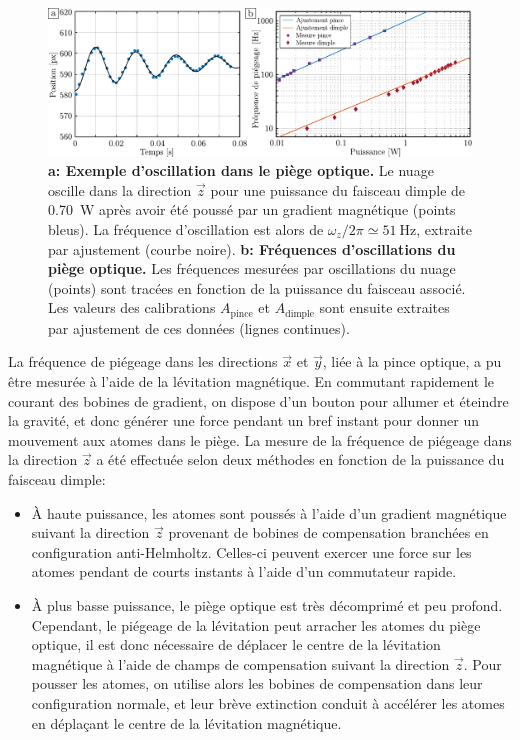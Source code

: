\begin{figure}
\centering
\includegraphics[width=\textwidth]{Fig/Modif_exp/frequences_piege_optique.pdf}
\caption{\textbf{a: Exemple d'oscillation dans le piège optique.} Le nuage oscille dans la direction $\vec{z}$ pour une puissance du faisceau dimple de \SI{0.70}{\watt} après avoir été poussé par un gradient magnétique (points bleus). La fréquence d'oscillation est alors de $\omega_z /2\pi \simeq \SI{51}{\hertz}$, extraite par ajustement (courbe noire). \textbf{b: Fréquences d'oscillations du piège optique.} Les fréquences mesurées par oscillations du nuage (points) sont tracées en fonction de la puissance du faisceau associé. Les valeurs des calibrations $A_{\mathrm{pince}}$ et $A_{\mathrm{dimple}}$ sont ensuite extraites par ajustement de ces données (lignes continues).}
\label{fig:frequences_piege_optique}
\end{figure}

La fréquence de piégeage dans les directions $\vec{x}$ et $\vec{y}$, liée à la pince optique, a pu être mesurée à l'aide de la lévitation magnétique. En commutant rapidement le courant des bobines de gradient, on dispose d'un bouton pour allumer et éteindre la gravité, et donc générer une force pendant un bref instant pour donner un mouvement aux atomes dans le piège. La mesure de la fréquence de piégeage dans la direction $\vec{z}$ a été effectuée selon deux méthodes en fonction de la puissance du faisceau dimple:
\begin{itemize}
\item[\textendash] À haute puissance, les atomes sont poussés à l'aide d'un gradient magnétique suivant la direction $\vec{z}$ provenant de bobines de compensation branchées en configuration anti-Helmholtz. Celles-ci peuvent exercer une force sur les atomes pendant de courts instants à l'aide d'un commutateur rapide.
\item[\textendash] À plus basse puissance, le piège optique est très décomprimé et peu profond. Cependant, le piégeage de la lévitation peut arracher les atomes du piège optique, il est donc nécessaire de déplacer le centre de la lévitation magnétique à l'aide de champs de compensation suivant la direction $\vec{z}$. Pour pousser les atomes, on utilise alors les bobines de compensation dans leur configuration normale, et leur brève extinction conduit à accélérer les atomes en déplaçant le centre de la lévitation magnétique.
\end{itemize}



